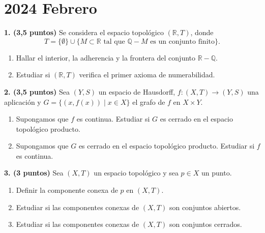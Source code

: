 \clearpage
\chapter*{2024 Febrero}

\begin{enunciado}
    \hypertarget{2024 B 1}{}
    \textbf{1. (3,5 puntos)} Se considera el espacio topológico \((\mathbb{R}, T)\), donde
    \[
        T = \{\emptyset\} \cup \{M \subset \mathbb{R} \text{ tal que } \mathbb{Q} - M \text{ es un conjunto finito}\}.
    \]
    \begin{enumerate}[label=\alph*)]
        \item Hallar el interior, la adherencia y la frontera del conjunto \(\mathbb{R} - \mathbb{Q}\).
        \item Estudiar si \((\mathbb{R}, T)\) verifica el primer axioma de numerabilidad.
    \end{enumerate}
\end{enunciado}

\begin{enunciado}
    \hypertarget{2024 B 2}{}
    \textbf{2. (3,5 puntos)} Sea \((Y, S)\) un espacio de Hausdorff, \(f : (X, T) \to (Y, S)\) una aplicación y \(G = \{(x, f(x)) \mid x \in X\}\) el grafo de \(f\) en \(X \times Y\).
    \begin{enumerate}[label=\alph*)]
        \item Supongamos que \(f\) es continua. Estudiar si \(G\) es cerrado en el espacio topológico producto.
        \item Supongamos que \(G\) es cerrado en el espacio topológico producto. Estudiar si \(f\) es continua.
    \end{enumerate}
\end{enunciado}

\begin{enunciado}
    \hypertarget{2024 B 3}{}
    \textbf{3. (3 puntos)} Sea \((X, T)\) un espacio topológico y sea \(p \in X\) un punto.
    \begin{enumerate}[label=\alph*)]
        \item Definir la componente conexa de \(p\) en \((X, T)\).
        \item Estudiar si las componentes conexas de \((X, T)\) son conjuntos abiertos.
        \item Estudiar si las componentes conexas de \((X, T)\) son conjuntos cerrados.
    \end{enumerate}
\end{enunciado}